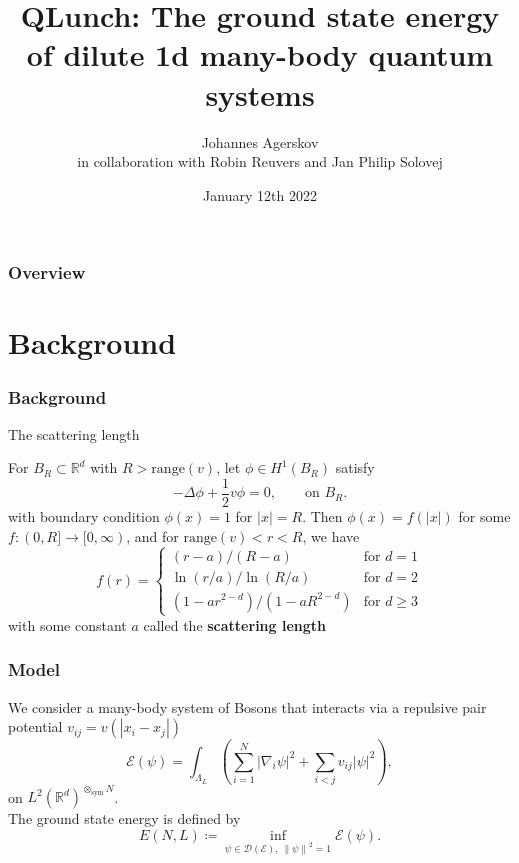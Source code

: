 \documentclass{beamer}[10]
\title{QLunch: The ground state energy of dilute 1d many-body quantum systems}
\subtitle{}
\author{Johannes Agerskov\\\vspace{0.2 cm}
	\scriptsize{in collaboration with Robin Reuvers and Jan Philip Solovej}}
\institute{QMATH \\ University of Copenhagen}
\date{January 12th 2022}
\newcommand{\norm}[1]{\left\lVert #1 \right\rVert}
\newcommand{\abs}[1]{\left\lvert #1 \right\rvert}
\newcommand{\R}{\mathbb{R}}
\begin{document}
\frame{\titlepage \vspace{-0.5cm}
}

\frame
{
\frametitle{Overview}
\tableofcontents%
}

\section{Background}

\begin{frame}
\frametitle{Background}
\begin{block}{The scattering length}
	\begin{Theorem}
		For $ B_R\subset \R^d $ with $ R>\text{range}(v) $, let $ \phi\in H^1(B_{R}) $ satisfy
	 \begin{equation}
		 -\Delta \phi +\frac12 v\phi=0,\qquad \text{on }B_R.
		 \end{equation}
		 with boundary condition $ \phi(x)=1 $ for $ \abs{x}=R$.
		 Then $ \phi(x)=f(\abs{x}) $ for some $ f:(0,R]\to [0,\infty) $, and for $ \text{range}(v)<r<R $, we have \begin{equation}
		 f(r)=\begin{cases}
		 (r-a)/(R-a) &\text{for }d=1\\
		 \ln(r/a)/\ln(R/a) &\text{for }d=2\\
		 (1-ar^{2-d})/(1-aR^{2-d})&\text{for }d\geq 3
		 \end{cases}
		 \end{equation}
		 with some constant $ a $ called the \textbf{scattering length}
	\end{Theorem}
\end{block}	
\end{frame}

\begin{frame}
	\frametitle{Model}
	We consider a many-body system of Bosons that interacts via a repulsive pair potential $ v_{ij}=v(\abs{x_i-x_j}) $\begin{equation}
	\mathcal{E}(\psi)=\int_{\Lambda_L}\left(\sum_{i=1}^{N}\abs{\nabla_i\psi}^2+\sum_{i<j} v_{ij}\abs{\psi}^2\right),
	\end{equation}
	on $ L^2(\R^d)^{\otimes_{\text{sym}} N} $.\\
	The ground state energy is defined by 
	$$
	E(N,L)\coloneqq\inf_{\psi\in\mathcal{D}(\mathcal{E}),\ \norm{\psi}^2=1}\mathcal{E}(\psi).
	$$
\end{frame}
\end{document}
